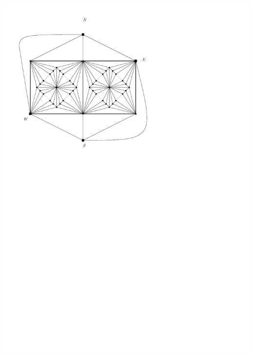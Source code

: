 \documentclass[a4paper]{article}
\begin{document}
\clearpage%
\includegraphics[scale=1]{fixExtension/img/manymanybase}
\clearpage%
\end{document}
